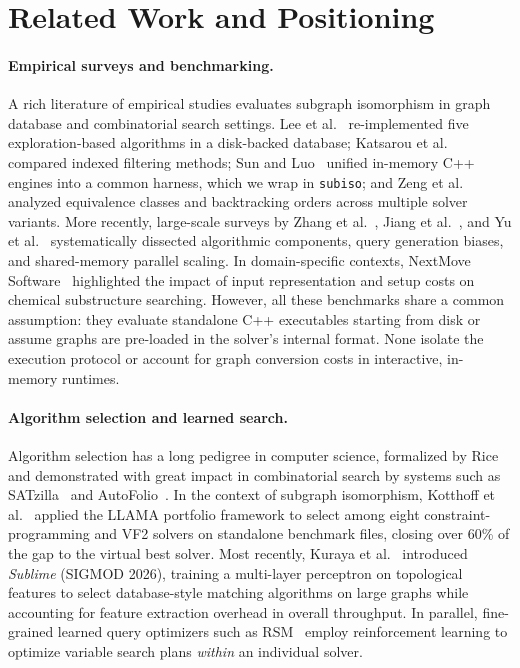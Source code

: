 \documentclass[11pt,a4paper]{article}
\begin{document}
\section{Related Work and Positioning}

\paragraph{Empirical surveys and benchmarking.} A rich literature of empirical studies evaluates subgraph isomorphism in graph database and combinatorial search settings. Lee et al.~\cite{lee2013comparison} re-implemented five exploration-based algorithms in a disk-backed database; Katsarou et al.~\cite{katsarou2015indexed} compared indexed filtering methods; Sun and Luo~\cite{sun2020indepth,sun2021rapidmatch} unified in-memory C++ engines into a common harness, which we wrap in \texttt{subiso}; and Zeng et al.~\cite{zeng2020deepanalysis} analyzed equivalence classes and backtracking orders across multiple solver variants. More recently, large-scale surveys by Zhang et al.~\cite{zhang2024survey}, Jiang et al.~\cite{jiang2025survey}, and Yu et al.~\cite{yu2026parallel} systematically dissected algorithmic components, query generation biases, and shared-memory parallel scaling. In domain-specific contexts, NextMove Software~\cite{nextmove2015faceoff} highlighted the impact of input representation and setup costs on chemical substructure searching. However, all these benchmarks share a common assumption: they evaluate standalone C++ executables starting from disk or assume graphs are pre-loaded in the solver's internal format. None isolate the execution protocol or account for graph conversion costs in interactive, in-memory runtimes.

\paragraph{Algorithm selection and learned search.} Algorithm selection has a long pedigree in computer science, formalized by Rice~\cite{rice1976algorithm} and demonstrated with great impact in combinatorial search by systems such as SATzilla~\cite{xu2008satzilla} and AutoFolio~\cite{lindauer2015autofolio}. In the context of subgraph isomorphism, Kotthoff et al.~\cite{kotthoff2016portfolios} applied the LLAMA portfolio framework to select among eight constraint-programming and VF2 solvers on standalone benchmark files, closing over 60\% of the gap to the virtual best solver. Most recently, Kuraya et al.~\cite{kuraya2026sublime} introduced \emph{Sublime} (SIGMOD 2026), training a multi-layer perceptron on topological features to select database-style matching algorithms on large graphs while accounting for feature extraction overhead in overall throughput. In parallel, fine-grained learned query optimizers such as RSM~\cite{li2025rsm} employ reinforcement learning to optimize variable search plans \emph{within} an individual solver.
\end{document}

